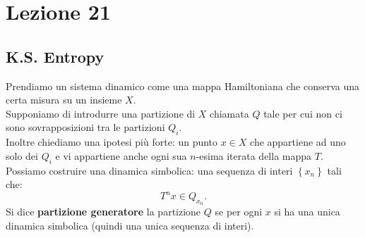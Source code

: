 \section{Lezione 21}%
\label{sub:Lezione 21}
\subsection{K.S. Entropy}%
\label{sub:K.S. Entropy}
Prendiamo un sistema dinamico come una mappa Hamiltoniana che conserva una certa misura su un insieme $X$.\\
Supponiamo di introdurre una partizione di $X$ chiamata $Q$ tale per cui non ci sono sovrapposizioni tra le partizioni $Q_i$.\\
Inoltre chiediamo una ipotesi più forte: un punto $x\in X$ che appartiene ad uno solo dei $Q_i$ e vi appartiene anche ogni sua $n$-esima iterata della mappa $T$.\\
Possiamo costruire una dinamica simbolica: una sequenza di interi $\left\{x_n\right\}$ tali che:
\[
    T^nx \in Q_{x_n}
.\] 
Si dice \textbf{partizione generatore} la partizione $Q$ se per ogni $x$ si ha una unica dinamica simbolica (quindi una unica sequenza di interi).
